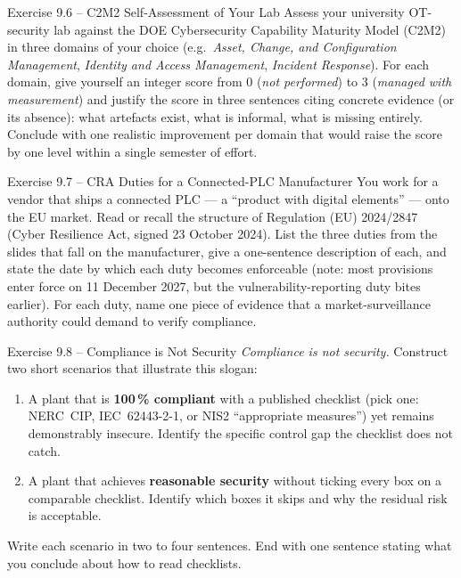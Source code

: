 \documentclass[11pt,a4paper]{article}
\begin{document}
\begin{taskbox}{Exercise 9.6 -- C2M2 Self-Assessment of Your Lab}
Assess your university OT-security lab against the DOE Cybersecurity Capability Maturity Model (C2M2) in three domains of your choice (e.g.\ \emph{Asset, Change, and Configuration Management}, \emph{Identity and Access Management}, \emph{Incident Response}). For each domain, give yourself an integer score from 0 (\emph{not performed}) to 3 (\emph{managed with measurement}) and justify the score in three sentences citing concrete evidence (or its absence): what artefacts exist, what is informal, what is missing entirely. Conclude with one realistic improvement per domain that would raise the score by one level within a single semester of effort.
\end{taskbox}

\begin{taskbox}{Exercise 9.7 -- CRA Duties for a Connected-PLC Manufacturer}
You work for a vendor that ships a connected PLC --- a ``product with digital elements'' --- onto the EU market. Read or recall the structure of Regulation (EU) 2024/2847 (Cyber Resilience Act, signed 23 October 2024). List the three duties from the slides that fall on the manufacturer, give a one-sentence description of each, and state the date by which each duty becomes enforceable (note: most provisions enter force on 11 December 2027, but the vulnerability-reporting duty bites earlier). For each duty, name one piece of evidence that a market-surveillance authority could demand to verify compliance.
\end{taskbox}

\begin{taskbox}{Exercise 9.8 -- Compliance is Not Security}
\emph{Compliance is not security.} Construct two short scenarios that illustrate this slogan:
\begin{enumerate}
  \item A plant that is \textbf{100\,\% compliant} with a published checklist (pick one: NERC~CIP, IEC~62443-2-1, or NIS2 ``appropriate measures'') yet remains demonstrably insecure. Identify the specific control gap the checklist does not catch.
  \item A plant that achieves \textbf{reasonable security} without ticking every box on a comparable checklist. Identify which boxes it skips and why the residual risk is acceptable.
\end{enumerate}
Write each scenario in two to four sentences. End with one sentence stating what you conclude about how to read checklists.
\end{taskbox}
\end{document}
